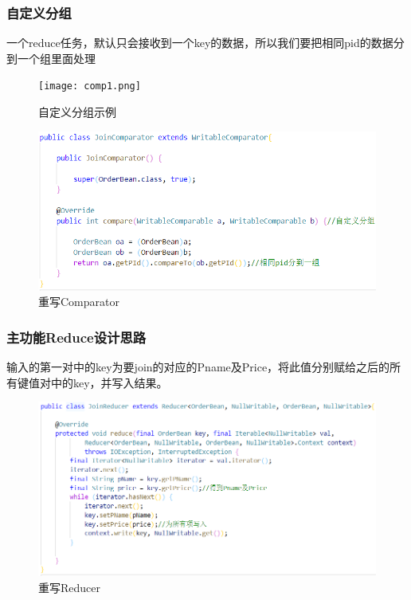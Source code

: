 \documentclass[a4paper,UTF8]{article}
\numberwithin{equation}{section}
\begin{document}
\subsubsection{自定义分组}
一个reduce任务，默认只会接收到一个key的数据，所以我们要把相同pid的数据分到一个组里面处理
\begin{figure}[H]
    \centering

    \texttt{[image: comp1.png]}

    \caption{自定义分组示例}
\end{figure}
\begin{figure}[H]
    \centering

    \includegraphics[width = 15cm]{comp2.png}

    \caption{重写Comparator}
\end{figure}
\subsubsection{主功能Reduce设计思路}
输入的第一对中的key为要join的对应的Pname及Price，将此值分别赋给之后的所有键值对中的key，并写入结果。
\begin{figure}[H]
    \centering

    \includegraphics[width = 15cm]{reducer.png}

    \caption{重写Reducer}
    \label{reducer}
\end{figure}
\end{document}
